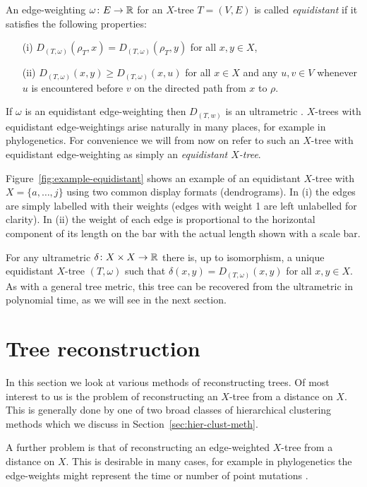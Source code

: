 An edge-weighting $\omega \colon E \to {\mathbb R}$ for an $X$-tree $T=(V,E)$ is
called \textit{equidistant} if it satisfies the following properties:
\begin{itemize}
\item[(i)] $D_{(T,\omega)}(\rho_T,x) = D_{(T,\omega)}(\rho_T,y)$ for all $x,y
  \in X$,
\item[(ii)] $D_{(T,\omega)}(x,y) \geq D_{(T,\omega)}(x,u)$ for all $x \in X$
  and any $u,v \in V$ whenever $u$ is encountered before $v$ on the directed
  path from $x$ to $\rho$.
\end{itemize}
If $\omega$ is an equidistant edge-weighting then $D_{(T,w)}$ is an
ultrametric \cite[Lemma 7.2.4]{semple2003phylogenetics}.  $X$-trees with
equidistant edge-weightings arise naturally in many places, for example in
phylogenetics.  For convenience we will from now on refer to such an $X$-tree
with equidistant edge-weighting as simply an \textit{equidistant $X$-tree}.

Figure~\ref{fig:example-equidistant} shows an example of an equidistant
$X$-tree with $X = \{a, \dotsc, j\}$ using two common display formats
(dendrograms).  In (i) the edges are simply labelled with their weights (edges
with weight 1 are left unlabelled for clarity).  In (ii) the weight of each
edge is proportional to the horizontal component of its length on the bar with
the actual length shown with a scale bar.

For any ultrametric $\delta \colon X \times X \to {\mathbb R}$ there is, up to
isomorphism, a unique equidistant $X$-tree $(T,\omega)$ such that $\delta(x,y)
= D_{(T,\omega)}(x,y)$ for all $x,y \in X$.  As with a general tree metric,
this tree can be recovered from the ultrametric in polynomial time, as we will
see in the next section.

\section{Tree reconstruction}
\label{sec:tree-construction}

In this section we look at various methods of reconstructing trees.  Of most
interest to us is the problem of reconstructing an $X$-tree from a distance on
$X$.  This is generally done by one of two broad classes of hierarchical
clustering methods which we discuss in Section~\ref{sec:hier-clust-meth}.

A further problem is that of reconstructing an edge-weighted $X$-tree from a
distance on $X$.  This is desirable in many cases, for example in
phylogenetics the edge-weights might represent the time or number of point
mutations \cite{felsenstein2004inferring}.

